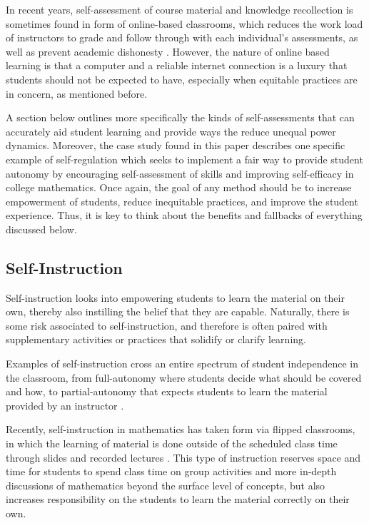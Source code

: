 In recent years, self-assessment of course material and knowledge recollection is sometimes found in form of online-based classrooms, which reduces the work load of instructors to grade and follow through with each individual's assessments, as well as prevent academic dishonesty \citep{ventista_self-assessment_2018}. However, the nature of online based learning is that a computer and a reliable internet connection is a luxury that students should not be expected to have, especially when equitable practices are in concern, as mentioned before.

A section below outlines more specifically the kinds of self-assessments that can accurately aid student learning and provide ways the reduce unequal power dynamics. Moreover, the case study found in this paper describes one specific example of self-regulation which seeks to implement a fair way to provide student autonomy by encouraging self-assessment of skills and improving self-efficacy in college mathematics. Once again, the goal of any method should be to increase empowerment of students, reduce inequitable practices, and improve the student experience. Thus, it is key to think about the benefits and fallbacks of everything discussed below.

\subsection{Self-Instruction}
Self-instruction looks into empowering students to learn the material on their own, thereby also instilling the belief that they are capable. Naturally, there is some risk associated to self-instruction, and therefore is often paired with supplementary activities or practices that solidify or clarify learning.

Examples of self-instruction cross an entire spectrum of student independence in the classroom, from full-autonomy where students decide what should be covered and how, to partial-autonomy that expects students to learn the material provided by an instructor \citep{burris_developmental_1972}.

Recently, self-instruction in mathematics has taken form via flipped classrooms, in which the learning of material is done outside of the scheduled class time through slides and recorded lectures \citep{lage_inverting_2000}. This type of instruction reserves space and time for students to spend class time on group activities and more in-depth discussions of mathematics beyond the surface level of concepts, but also increases responsibility on the students to learn the material correctly on their own.

